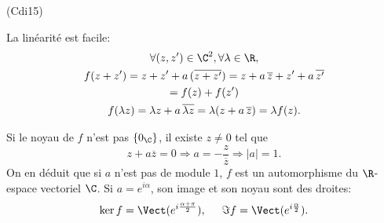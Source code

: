 \begin{tiny}(Cdi15)\end{tiny} La linéarité est facile:
\begin{multline*}
 \forall(z,z')\in \C^2, \forall \lambda \in \R,\\
 f(z+z') = z+z' + a\,(\overline{z + z'}) 
 = z+a\,\overline{z} + z'+a\,\overline{z'} \\
 = f(z) + f(z') \\
 f(\lambda z) = \lambda z + a\, \overline{\lambda z} 
 = \lambda (z + a\, \overline{z})
 = \lambda f(z).
\end{multline*}

Si le noyau de $f$ n'est pas $\left\lbrace 0_{\C} \right\rbrace $, il existe $z\neq 0$ tel que
\[
 z+a\overline{z}= 0 \Rightarrow a = -\frac{z}{\overline{z}}
 \Rightarrow |a| = 1.
\]
On en déduit que si $a$ n'est pas de module $1$, $f$ est un automorphisme du $\R$-espace vectoriel $\C$.\newline
Si $a = e^{i \alpha}$, son image et son noyau sont des droites:
\[
 \ker f = \Vect(e^{i\frac{\alpha + \pi}{2}}), \hspace{0.5cm}
 \Im f = \Vect(e^{i\frac{\alpha}{2}}).
\]
